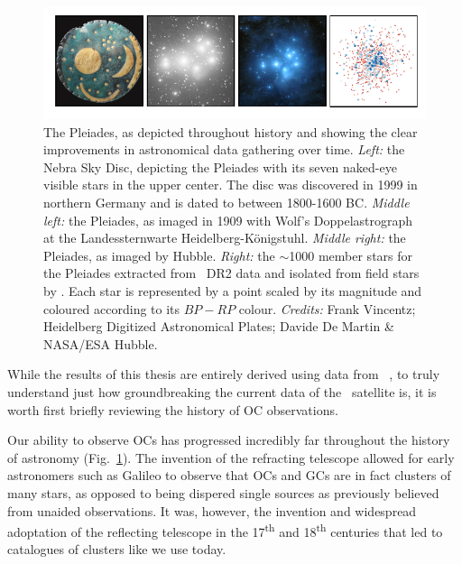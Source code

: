 \begin{figure}[tb]
	\includegraphics[width=\textwidth]{fig/c1/pleiades.pdf}
	\caption[The Pleiades as depicted throughout history]{The Pleiades, as depicted throughout history and showing the clear improvements in astronomical data gathering over time. \emph{Left:} the Nebra Sky Disc, depicting the Pleiades with its seven naked-eye visible stars in the upper center. The disc was discovered in 1999 in northern Germany and is dated to between 1800-1600 BC. \emph{Middle left:} the Pleiades, as imaged in 1909 with Wolf's Doppelastrograph at the Landessternwarte Heidelberg-Königstuhl. \emph{Middle right:} the Pleiades, as imaged by Hubble. \emph{Right:} the $\sim$1000 member stars for the Pleiades extracted from \gaia\ DR2 data and isolated from field stars by \cite{cantat-gaudin_characterising_2018}. Each star is represented by a point scaled by its magnitude and coloured according to its $BP-RP$ colour. \emph{Credits:} Frank Vincentz; Heidelberg Digitized Astronomical Plates; Davide De Martin \& NASA/ESA Hubble.}
	\label{fig:intro:history:pleiades}
\end{figure}

While the results of this thesis are entirely derived using data from \gaia\ , to truly understand just how groundbreaking the current data of the \gaia\ satellite is, it is worth first briefly reviewing the history of OC observations.

Our ability to observe OCs has progressed incredibly far throughout the history of astronomy (Fig.~\ref{fig:intro:history:pleiades}). The invention of the refracting telescope allowed for early astronomers such as Galileo to observe that OCs and GCs are in fact clusters of many stars, as opposed to being dispered single sources as previously believed from unaided observations. It was, however, the invention and widespread adoptation of the reflecting telescope in the 17\textsuperscript{th} and 18\textsuperscript{th} centuries that led to catalogues of clusters like we use today.

